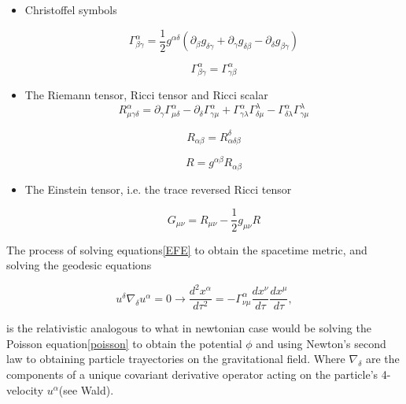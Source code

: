 \begin{itemize}
\item Christoffel symbols

\begin{equation}\label{christoffel}
\Gamma^{\alpha}_{\beta \gamma} = \frac{1}{2} g^{\alpha \delta}(\partial_{\beta} g_{\delta \gamma} + \partial_{\gamma} g_{\delta \beta} - \partial_{\delta} g_{\beta \gamma})
\end{equation}

\begin{equation}
\Gamma^{\alpha}_{\beta \gamma} = \Gamma^{\alpha}_{\gamma \beta}
\end{equation}


\item The Riemann tensor, Ricci tensor and Ricci scalar 
\begin{equation}\label{riemann}
R^{\alpha}_{\mu\gamma \delta} = \partial_{\gamma} \Gamma^{\alpha}_{\mu \delta} - \partial_{\delta} \Gamma^{\alpha}_{\gamma \mu} +  \Gamma^{\alpha}_{\gamma \lambda} \Gamma^{\lambda}_{\delta \mu} - \Gamma^{\alpha}_{\delta \lambda} \Gamma^{\lambda}_{\gamma \mu}
\end{equation}

\begin{equation}
R_{\alpha \beta}= R^{\delta}_{\alpha \delta \beta}
\end{equation}

\begin{equation}
R = g^{\alpha \beta}R_{\alpha \beta}
\end{equation}

\item The Einstein tensor, i.e. the trace reversed Ricci tensor

\begin{equation}
G_{\mu\nu} = R_{\mu\nu} - \frac{1}{2} g_{\mu\nu} R
\end{equation}


\end{itemize}


The process of solving equations\ref{EFE} to obtain the spacetime metric, and solving the geodesic equations 

\begin{equation}\label{par-trans}
u^{\delta} \nabla_{\delta } u^{\alpha } = 
0 \rightarrow \frac{d^2 x^{\alpha}}{d\tau^2} = - \Gamma^{\alpha}_{\nu\mu} \frac{dx^{\nu}}{d\tau} \frac{dx^{\mu}}{d\tau},
\end{equation}

is the relativistic analogous to what in newtonian case would be solving the Poisson equation\ref{poisson} to obtain the potential $\phi$ and using Newton's second law to obtaining particle trayectories on the gravitational field. Where  $\nabla_{\delta}$ are the components of a unique covariant derivative operator acting on the particle's 4-velocity $u^{\alpha}$(see Wald\cite[chapter X]{Wald:1984rg}). 

